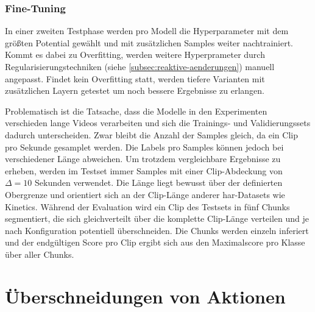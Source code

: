 \subsubsection*{Fine-Tuning}

In einer zweiten Testphase werden pro Modell die Hyperparameter mit dem größten Potential gewählt und mit zusätzlichen Samples weiter nachtrainiert.
Kommt es dabei zu Overfitting, werden weitere Hyperprameter durch Regularisierungstechniken (siehe \autoref{subsec:reaktive-aenderungen}) manuell angepasst.
Findet kein Overfitting statt, werden \ggf tiefere Varianten mit zusätzlichen Layern getestet um noch bessere Ergebnisse zu erlangen.

Problematisch ist die Tatsache, dass die Modelle in den Experimenten verschieden lange Videos verarbeiten und sich die Trainings- und Validierungssets dadurch unterscheiden.
Zwar bleibt die Anzahl der Samples gleich, da ein Clip pro Sekunde gesamplet werden.
Die Labels pro Samples können jedoch bei verschiedener Länge abweichen.
Um trotzdem vergleichbare Ergebnisse zu erheben, werden im Testset immer Samples mit einer Clip-Abdeckung von $\Delta=10$ Sekunden verwendet.
Die Länge liegt bewusst über der definierten Obergrenze und orientiert sich an der Clip-Länge anderer \gls{har}-Datasets wie Kinetics.
Während der Evaluation wird ein Clip des Testsets in fünf Chunks segmentiert, die sich gleichverteilt über die komplette Clip-Länge verteilen und je nach Konfiguration potentiell überschneiden.
Die Chunks werden einzeln inferiert und der endgültigen Score pro Clip ergibt sich aus den Maximalscore pro Klasse über aller Chunks.



\section{Überschneidungen von Aktionen}

